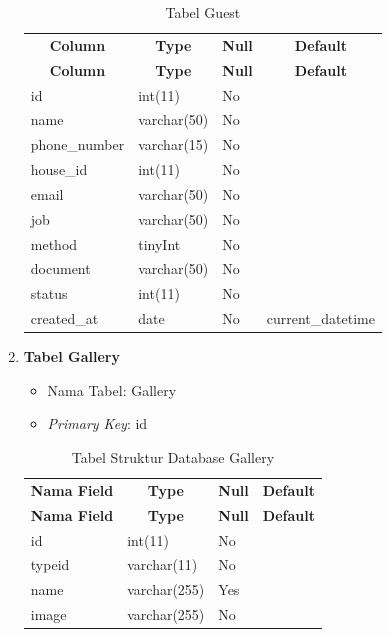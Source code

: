 \begin{enumerate}
   \begin{longtable}{|p{3cm}|p{3cm}|p{2cm}|p{3cm}|}
	    \captionsetup{position=above} %
	    \caption{Tabel Guest}
	    \label{tab:struktur-database} \\ \hline
	    \multicolumn{1}{|c|}{\textbf{Column}} & \multicolumn{1}{c|}{\textbf{Type}} & \multicolumn{1}{c|}{\textbf{Null}} & \multicolumn{1}{c|}{\textbf{Default}} \\ \hline
	    \endfirsthead
	    \hline
	    \multicolumn{1}{|c|}{\textbf{Column}} & \multicolumn{1}{c|}{\textbf{Type}} & \multicolumn{1}{c|}{\textbf{Null}} & \multicolumn{1}{c|}{\textbf{Default}} \\ \hline
	    \endhead
	    id & int(11) & No & \\ \hline
	    name & varchar(50) & No & \\ \hline
	    phone\_number &	varchar(15) & No & \\ \hline
	    house\_id & int(11) & No & \\ \hline
	    email & varchar(50) & No & \\ \hline
		job & varchar(50) & No & \\ \hline
		method & tinyInt & No & \\ \hline
		document & varchar(50) & No & \\ \hline
		status & int(11) & No & \\ \hline
		created\_at & date & No & current\_datetime \\ \hline
	\end{longtable}

    \item \textbf{Tabel Gallery}
    
    \begin{itemize}
        \item Nama Tabel: Gallery
        \item \textit{Primary Key}: id
    \end{itemize}

    \begin{longtable}{|p{3cm}|p{3cm}|p{2cm}|p{3cm}|}
	    \captionsetup{position=above} %
	    \caption{Tabel Struktur Database Gallery}
	    \label{tab:struktur-database} \\ \hline
	    \multicolumn{1}{|c|}{\textbf{Nama Field}} & \multicolumn{1}{c|}{\textbf{Type}} & \multicolumn{1}{c|}{\textbf{Null}} & \multicolumn{1}{c|}{\textbf{Default}} \\ \hline
	    \endfirsthead
	    \hline
	    \multicolumn{1}{|c|}{\textbf{Nama Field}} & \multicolumn{1}{c|}{\textbf{Type}} & \multicolumn{1}{c|}{\textbf{Null}} & \multicolumn{1}{c|}{\textbf{Default}} \\ \hline
	    \endhead
	    id & int(11) & No & \\ \hline
	    typeid & varchar(11) & No & \\ \hline
	    name & varchar(255) & Yes & \\ \hline
	    image & varchar(255) & No & \\ \hline
	\end{longtable}

\end{enumerate}
